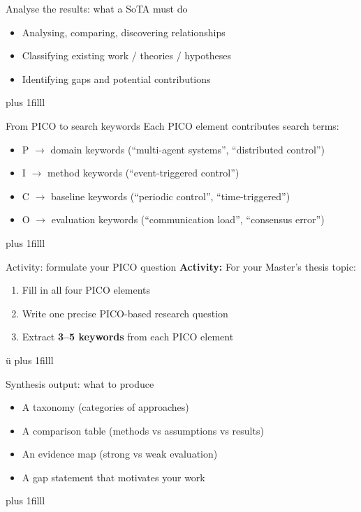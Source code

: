 \documentclass[aspectratio=169]{beamer}
\newcommand{\btVFill}{\vskip0pt plus 1filll}
\newcommand{\Activity}[1]{\textbf{Activity:} #1}
\begin{document}
\begin{frame}{Analyse the results: what a SoTA must do}
  \begin{itemize}
    \item Analysing, comparing, discovering relationships
    \item Classifying existing work / theories / hypotheses
    \item Identifying gaps and potential contributions
  \end{itemize}
\btVFill\end{frame}

\begin{frame}{From PICO to search keywords}
  Each PICO element contributes search terms:

  \bigskip
  \begin{itemize}
    \item P $\rightarrow$ domain keywords (``multi-agent systems'', ``distributed control'')
    \item I $\rightarrow$ method keywords (``event-triggered control'')
    \item C $\rightarrow$ baseline keywords (``periodic control'', ``time-triggered'')
    \item O $\rightarrow$ evaluation keywords (``communication load'', ``consensus error'')
  \end{itemize}

 \btVFill
\end{frame}

\begin{frame}{Activity: formulate your PICO question}
  \Activity{
  For your Master’s thesis topic:
  \begin{enumerate}
    \item Fill in all four PICO elements
    \item Write one precise PICO-based research question
    \item Extract \textbf{3--5 keywords} from each PICO element
  \end{enumerate}
  }
ü  \btVFill
\end{frame}


\begin{frame}{Synthesis output: what to produce}
  \begin{itemize}
    \item A taxonomy (categories of approaches)
    \item A comparison table (methods vs assumptions vs results)
    \item An evidence map (strong vs weak evaluation)
    \item A gap statement that motivates your work
  \end{itemize}
  \btVFill
\end{frame}
\end{document}
